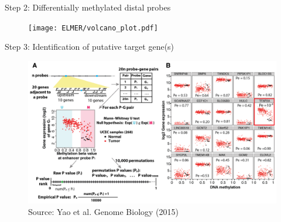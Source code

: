 \documentclass[slidestop,compress,11pt,xcolor=dvipsnames]{beamer}
\begin{document}

\begin{frame}{Step 2: Differentially methylated distal probes}
 \begin{figure}
  \centering
  \texttt{[image: ELMER/volcano\_plot.pdf]}
 \end{figure}
\end{frame}

\begin{frame}{Step 3: Identification of putative target gene(s)}
 \vspace*{-0.4cm}
 \begin{figure}
\hspace*{-0.5cm}
\includegraphics[width=1.1\linewidth]{ELMER/pair.png}{\tiny{\\\vspace{-0.3cm}Source: Yao et al. Genome Biology (2015)}}
 \end{figure}
\end{frame}



\end{document}
